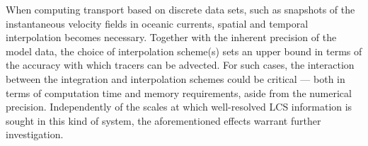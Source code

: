 When computing transport based on discrete data sets, such as snapshots of the
instantaneous velocity fields in oceanic currents, spatial and temporal
interpolation becomes necessary. Together with the inherent precision of the
model data, the choice of interpolation scheme(s) sets an upper bound
in terms of the accuracy with which tracers can be advected. For such cases,
the interaction between the integration and interpolation schemes could
be critical --- both in terms of computation time and memory requirements,
aside from the numerical precision. Independently of the scales at which
well-resolved LCS information is sought in this kind of system, the
aforementioned effects warrant further investigation.
